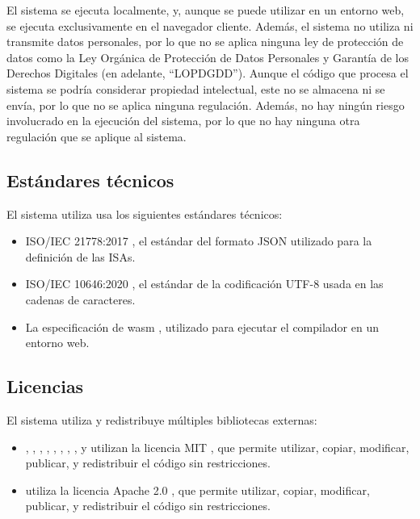 El sistema se ejecuta localmente, y, aunque se puede utilizar en un entorno web,
se ejecuta exclusivamente en el navegador cliente. Además, el sistema no utiliza
ni transmite datos personales, por lo que no se aplica ninguna ley de protección
de datos como la Ley Orgánica de Protección de Datos Personales y Garantía de
los Derechos Digitales (en adelante, ``LOPDGDD''). Aunque el código
 que procesa el sistema se podría considerar
propiedad intelectual, este no se almacena ni se envía, por lo que no se aplica
ninguna regulación. Además, no hay ningún riesgo involucrado en la ejecución del
sistema, por lo que no hay ninguna otra regulación que se aplique al sistema.

\subsection{Estándares técnicos}\label{subsec:standards}

\noindent
El sistema utiliza usa los siguientes estándares técnicos:

\begin{itemize}
    \item ISO/IEC 21778:2017 \parencite{JSONStandard}, el estándar del formato
    JSON utilizado para la definición de las \glspl{ISA}.
    \item ISO/IEC 10646:2020 \parencite{UTF-8}, el estándar de la codificación
    UTF-8 usada en las cadenas de caracteres.
    \item La especificación de \gls{wasm} \parencite{wasm-spec}, utilizado para
    ejecutar el compilador en un entorno web.
\end{itemize}

\subsection{Licencias}\label{subsec:licenses}

El sistema utiliza y redistribuye múltiples bibliotecas externas:

\begin{itemize}
    \item {}, , ,
    , , 
    , , , y
     utilizan la licencia MIT \parencite{MIT}, que permite
    utilizar, copiar, modificar, publicar, y redistribuir el código sin
    restricciones.
    \item {} utiliza la licencia Apache 2.0
    \parencite{apache2}, que permite utilizar, copiar, modificar, publicar, y redistribuir el código sin
    restricciones.
\end{itemize}

